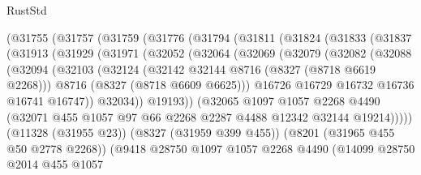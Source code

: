 \begin{lexlean}{RustStd}
\begin{coremodule}
{\begin{coremodule}
{{{{{{{{{{{{{{{{{{{{{{{{{{{{{{{{{{{{{{{{{{{{{{{{{{{{{{      (@31755
        (@31757
          (@31759
            (@31776
              (@31794
                (@31811
                  (@31824
                    (@31833
                      (@31837
                        (@31913
                          (@31929
                            (@31971
                              (@32052
                                (@32064
                                  (@32069
                                    (@32079
                                      (@32082
                                        (@32088
                                          (@32094
                                            (@32103
                                              (@32124
                                                (@32142 @32144 @8716 (@8327 (@8718 @6619 @2268)))
                                                @8716
                                                (@8327 (@8718 @6609 @6625)))
                                              @16726
                                              @16729
                                              @16732
                                              @16736
                                              @16741
                                              @16747))
                                          @32034))
                                      @19193))
                                  (@32065
                                    @1097
                                    @1057
                                    @2268
                                    @4490
                                    (@32071
                                      @455
                                      @1057
                                      @97
                                      @66
                                      @2268
                                      @2287
                                      @4488
                                      @12342
                                      @32144
                                      @19214)))))
                            (@11328 (@31955 @23))
                            (@8327 (@31959 @399 @455))
                            (@8201 (@31965 @455 @50 @2778 @2268))
                            (@9418
                              @28750
                              @1097
                              @1057
                              @2268
                              @4490
                              (@14099
                                @28750
                                @2014
                                @455
                                @1057
}}}}}}}}}}}}}}}}}}}}}}}}}}}}}}}}}}}}}}}}}}}}}}}}}}}}}}
\end{coremodule}}
\end{coremodule}
\end{lexlean}
